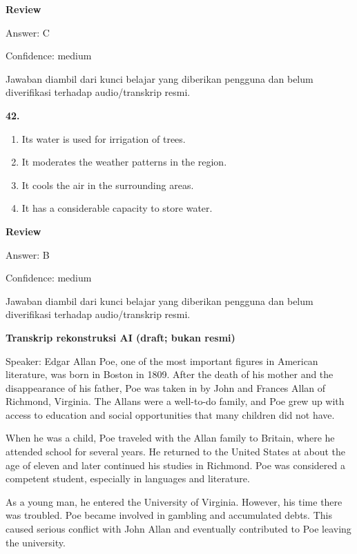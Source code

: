 \documentclass[12pt]{article}
\begin{document}
\textbf{Review}\par
Answer: C\par
Confidence: medium\par
Jawaban diambil dari kunci belajar yang diberikan pengguna dan belum diverifikasi terhadap audio/transkrip resmi.\par
\endgroup
\par
\vspace{0.25\baselineskip}
\noindent\textbf{42.}
\begin{enumerate}[label=(\Alph*),leftmargin=*,itemsep=0.2em]
\item Its water is used for irrigation of trees.
\item It moderates the weather patterns in the region.
\item It cools the air in the surrounding areas.
\item It has a considerable capacity to store water.
\end{enumerate}
\par
\begingroup
\setlength{\parskip}{0pt}
\setlength{\parindent}{0pt}
\textbf{Review}\par
Answer: B\par
Confidence: medium\par
Jawaban diambil dari kunci belajar yang diberikan pengguna dan belum diverifikasi terhadap audio/transkrip resmi.\par
\endgroup
\par
\vspace{0.25\baselineskip}
\begin{exampleblock}
\textbf{Transkrip rekonstruksi AI (draft; bukan resmi)}\par
Speaker: Edgar Allan Poe, one of the most important figures in American literature, was born in Boston in 1809. After the death of his mother and the disappearance of his father, Poe was taken in by John and Frances Allan of Richmond, Virginia. The Allans were a well-to-do family, and Poe grew up with access to education and social opportunities that many children did not have.\par
When he was a child, Poe traveled with the Allan family to Britain, where he attended school for several years. He returned to the United States at about the age of eleven and later continued his studies in Richmond. Poe was considered a competent student, especially in languages and literature.\par
As a young man, he entered the University of Virginia. However, his time there was troubled. Poe became involved in gambling and accumulated debts. This caused serious conflict with John Allan and eventually contributed to Poe leaving the university.\par
\end{exampleblock}
\end{document}
